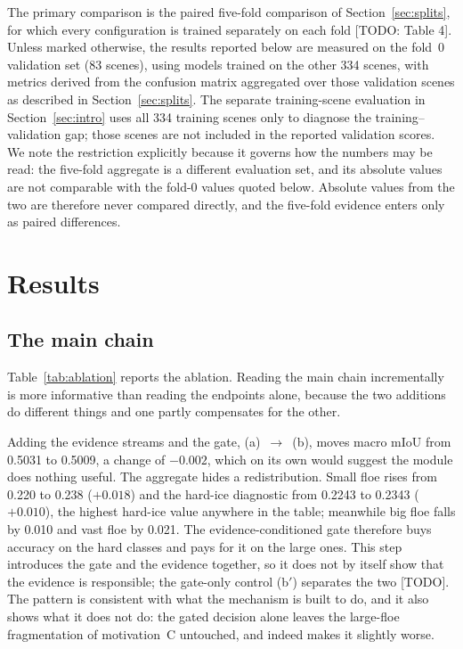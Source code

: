 \documentclass[preprint,12pt,authoryear]{elsarticle}
\begin{document}
The primary comparison is the paired five-fold comparison of
Section~\ref{sec:splits}, for which every configuration is trained separately
on each fold [TODO: Table 4]. Unless marked otherwise, the results reported
below are measured on the fold~0
validation set (83 scenes), using models trained on the other 334 scenes,
with metrics derived from the confusion matrix aggregated over those
validation scenes as described in Section~\ref{sec:splits}. The separate
training-scene evaluation in Section~\ref{sec:intro} uses all 334 training
scenes only to diagnose the training--validation gap; those scenes are not
included in the reported validation scores. We note the restriction explicitly
because it governs how the numbers may be read: the five-fold aggregate is a
different evaluation set, and its absolute values are not comparable with the
fold-0 values quoted below. Absolute values from the two are therefore never
compared directly, and the five-fold evidence enters only as paired
differences.

\section{Results}
\label{sec:results}

\subsection{The main chain}

Table~\ref{tab:ablation} reports the ablation. Reading the main chain
incrementally is more informative than reading the endpoints alone, because the
two additions do different things and one partly compensates for the other.

Adding the evidence streams and the gate, (a)~$\rightarrow$~(b), moves macro
mIoU from 0.5031 to 0.5009, a change of $-0.002$, which on its own would
suggest the module does nothing useful. The aggregate hides a redistribution.
Small floe rises from 0.220 to 0.238 ($+0.018$) and the hard-ice diagnostic from
0.2243 to 0.2343 ($+0.010$), the highest hard-ice value anywhere in the table;
meanwhile big floe falls by 0.010 and vast floe by 0.021. The
evidence-conditioned gate therefore buys accuracy on the hard classes and pays
for it on the large ones. This step introduces the gate and the evidence
together, so it does not by itself show that the evidence is responsible; the
gate-only control (b$'$) separates the two [TODO]. The pattern is consistent
with what the mechanism is built to do, and it also shows what it does not do:
the gated decision alone leaves the large-floe fragmentation of motivation~C
untouched, and indeed makes it slightly worse.
\end{document}
